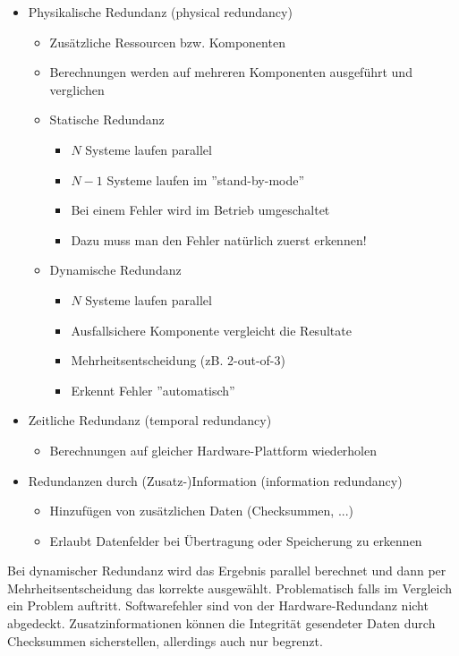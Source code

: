 \documentclass[a4paper,12pt,leqno]{article}
\begin{document}
\begin{itemize}
\item Physikalische Redundanz (physical redundancy)
	\begin{itemize}
	\item Zusätzliche Ressourcen bzw. Komponenten
	\item Berechnungen werden auf mehreren Komponenten ausgeführt und verglichen
	\item Statische Redundanz
		\begin{itemize}
		\item $N$ Systeme laufen parallel
		\item $N-1$ Systeme laufen im  ''stand-by-mode''
		\item Bei einem Fehler wird im Betrieb umgeschaltet
		\item Dazu muss man den Fehler natürlich zuerst erkennen!
		\end{itemize}
	\item Dynamische Redundanz
		\begin{itemize}
		\item $N$ Systeme laufen parallel
		\item Ausfallsichere Komponente vergleicht die Resultate
		\item Mehrheitsentscheidung (zB. 2-out-of-3)
		\item Erkennt Fehler ''automatisch''
		\end{itemize}
	\end{itemize}
\item Zeitliche Redundanz (temporal redundancy)
	\begin{itemize}
	\item Berechnungen auf gleicher Hardware-Plattform wiederholen
	\end{itemize}
\item Redundanzen durch (Zusatz-)Information (information redundancy)
	\begin{itemize}
	\item Hinzufügen von zusätzlichen Daten (Checksummen, ...)
	\item Erlaubt Datenfelder bei Übertragung oder Speicherung zu erkennen
	\end{itemize}
\end{itemize}
Bei dynamischer Redundanz wird das Ergebnis parallel berechnet und dann per Mehrheitsentscheidung das korrekte ausgewählt. Problematisch falls im Vergleich ein Problem auftritt. Softwarefehler sind von der Hardware-Redundanz nicht abgedeckt.
Zusatzinformationen können die Integrität gesendeter Daten durch Checksummen sicherstellen, allerdings auch nur begrenzt.\\
\end{document}
